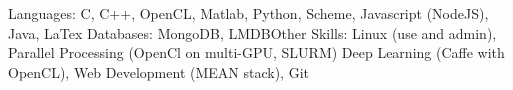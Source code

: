 

\begin{cventries}

  \cventry
    {}
	{}
	{}
	{}
	{Languages: C, C++, OpenCL, Matlab, Python, Scheme, Javascript (NodeJS), Java, LaTex \newline Databases: MongoDB, LMDB\newline Other Skills: Linux (use and admin), Parallel Processing (OpenCl on multi-GPU, SLURM) Deep Learning (Caffe with OpenCL), Web Development (MEAN stack), Git}
\end{cventries}
